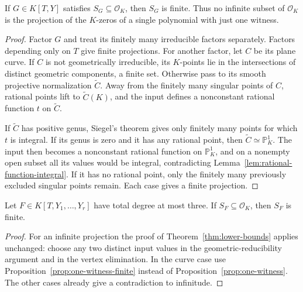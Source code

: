 \begin{proposition}\label{prop:one-witness-finite}
If $G\in K[T,Y]$ satisfies $S_G\subseteq\mathcal O_K$, then $S_G$ is finite.
Thus no infinite subset of $\mathcal O_K$ is the projection of the
$K$-zeros of a single polynomial with just one witness.
\end{proposition}
\begin{proof}
Factor $G$ and treat its finitely many irreducible factors separately.
Factors depending only on $T$ give finite projections.  For another factor,
let $C$ be its plane curve.  If $C$ is not geometrically irreducible, its
$K$-points lie in the intersections of distinct geometric components,
a finite set.  Otherwise pass to its smooth projective normalization
$\widetilde C$.  Away from the finitely many singular points of $C$,
rational points lift to $\widetilde C(K)$, and the input defines a
nonconstant rational function $t$ on $\widetilde C$.

If $\widetilde C$ has positive genus, Siegel's theorem gives only finitely
many points for which $t$ is integral.  If its genus is zero and it has
any rational point, then $\widetilde C\simeq\mathbb P^1_K$.
The input then becomes a nonconstant rational function on
$\mathbb P^1_K$, and on a nonempty open subset all its values would be
integral, contradicting Lemma~\ref{lem:rational-function-integral}.
If it has no rational point, only the finitely many previously excluded
singular points remain.  Each case gives a finite projection.
\end{proof}

\begin{corollary}\label{cor:cubic-finite}
Let $F\in K[T,Y_1,\ldots,Y_r]$ have total degree at most three.
If $S_F\subseteq\mathcal O_K$, then $S_F$ is finite.
\end{corollary}
\begin{proof}
For an infinite projection the proof of
Theorem~\ref{thm:lower-bounds} applies unchanged: choose any two distinct
input values in the geometric-reducibility argument and in the vertex
elimination.  In the curve case use
Proposition~\ref{prop:one-witness-finite} instead of
Proposition~\ref{prop:one-witness}.  The other cases already give a
contradiction to infinitude.
\end{proof}
